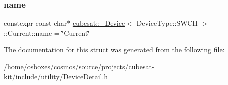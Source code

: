 \subsubsection{\texorpdfstring{name}{name}}
{\footnotesize\ttfamily constexpr const char$\ast$ \hyperlink{structcubesat_1_1__Device}{cubesat\+::\+\_\+\+Device}$<$ Device\+Type\+::\+S\+W\+CH $>$\+::Current\+::name = \char`\"{}Current\char`\"{}\hspace{0.3cm}{\ttfamily [static]}}



The documentation for this struct was generated from the following file\+:\begin{DoxyCompactItemize}
\item 
/home/osboxes/cosmos/source/projects/cubesat-\/kit/include/utility/\hyperlink{DeviceDetail_8h}{Device\+Detail.\+h}\end{DoxyCompactItemize}
